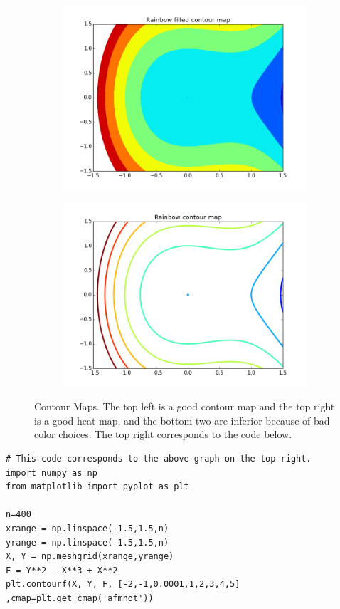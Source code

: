 \begin{figure}[h]
\begin{subfigure}{.45\textwidth}
\includegraphics[width=\textwidth]{contour_map_rainbow_filled.png}
\end{subfigure}
\begin{subfigure}{.45\textwidth}
\centering
\includegraphics[width=\textwidth]{contour_map_rainbow.png}
\end{subfigure}
\caption{Contour Maps.  The top left is a good contour map and the top right is a good heat map, and the bottom two are inferior because of bad color choices.  The top right corresponds to the code below.}
\label{fig:contour}
\end{figure}

\begin{lstlisting}
# This code corresponds to the above graph on the top right.
import numpy as np
from matplotlib import pyplot as plt

n=400
xrange = np.linspace(-1.5,1.5,n)
yrange = np.linspace(-1.5,1.5,n)
X, Y = np.meshgrid(xrange,yrange)
F = Y**2 - X**3 + X**2
plt.contourf(X, Y, F, [-2,-1,0.0001,1,2,3,4,5] ,cmap=plt.get_cmap('afmhot'))
\end{lstlisting}


